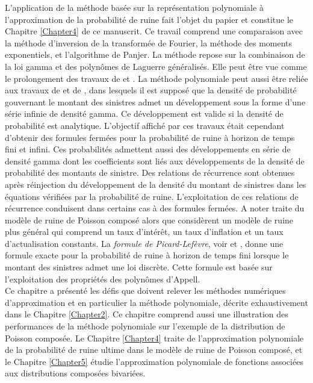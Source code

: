 L'application de la méthode basée sur la représentation polynomiale à l'approximation de la probabilité de ruine fait l'objet du papier \citet{GoLoPo15a} et constitue le Chapitre \ref{Chapter4} de ce manuscrit. Ce travail comprend une comparaison avec la méthode d'inversion de la transformée de Fourier, la méthode des moments exponentiels, et l'algorithme de Panjer. La méthode repose sur la combinaison de la loi gamma et des polynômes de Laguerre généralisés. Elle peut être vue comme le prolongement des travaux de \citet{Bo66} et \citet{Be69}. La méthode polynomiale peut aussi être reliée aux travaux de \citet{Ta78} et de \citet{AlTeTi01}, dans lesquels il est supposé que la densité de probabilité gouvernant le montant des sinistres admet un développement sous la forme d'une série infinie de densité gamma. Ce développement est valide si la densité de probabilité est analytique. L'objectif affiché par ces travaux était cependant d'obtenir des formules fermées pour la probabilité de ruine à horizon de temps fini et infini. Ces probabilités admettent aussi des développements en série de densité gamma dont les coefficients sont liés aux développements de la densité de probabilité des montants de sinistre. Des relations de récurrence sont obtenues après réinjection du développement de la densité du montant de sinistres dans les équations vérifiées par la probabilité de ruine. L'exploitation de ces relations de récurrence conduisent dans certains cas à des formules fermées. A noter \citet{Ta78} traite du modèle de ruine de Poisson composé alors que \citet{AlTeTi01} considèrent un modèle de ruine plus général qui comprend un taux d'intérêt, un taux d'inflation et un taux d'actualisation constants. La \textit{formule de Picard-Lefèvre}, voir \citet{PiLe97} et \citet{RuLo04}, donne une formule exacte pour la probabilité de ruine à horizon de temps fini lorsque le montant des sinistres admet une loi discrète. Cette formule est basée sur l\rq{}exploitation des propriétés des polynômes d\rq{}Appell.\\

Ce chapitre a présenté les défis que doivent relever les méthodes numériques d\rq{}approximation et en particulier la méthode polynomiale, décrite exhaustivement dans le Chapitre \ref{Chapter2}. Ce chapitre comprend aussi une illustration des performances de la méthode polynomiale sur l\rq{}exemple de la distribution de Poisson composée. Le Chapitre \ref{Chapter4} traite de l\rq{}approximation polynomiale de la probabilité de ruine ultime dans le modèle de ruine de Poisson composé, et le Chapitre \ref{Chapter5} étudie l\rq{}approximation polynomiale de fonctions associées aux distributions composées bivariées.   
%
%



